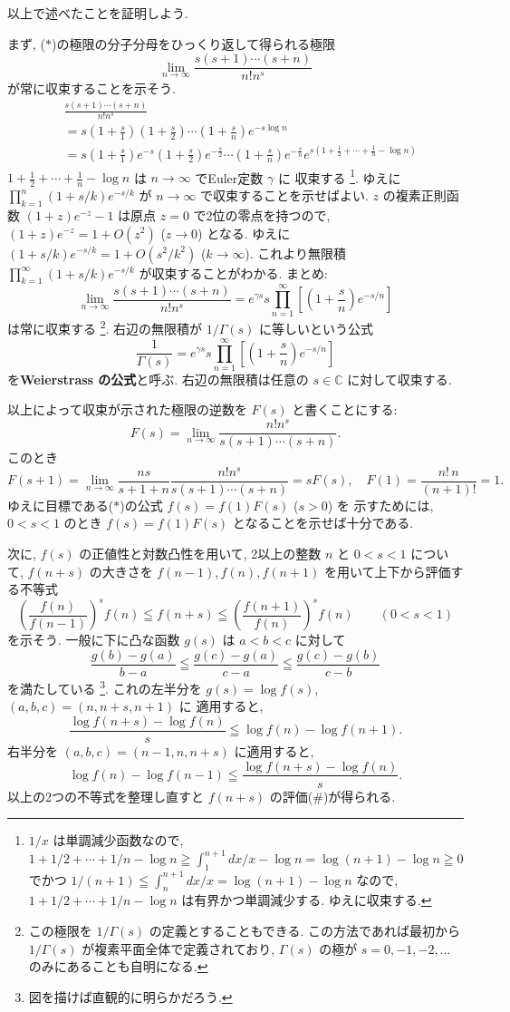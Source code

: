 \documentclass[12pt,twoside]{jarticle}
\newcommand\C{{\mathbb C}} %
\theoremstyle{jplain}
\theoremstyle{jplain}
\theoremstyle{jplain}
\numberwithin{theorem}{section}
\numberwithin{equation}{section}
\numberwithin{figure}{section}
\numberwithin{table}{section}
\begin{document}
以上で述べたことを証明しよう.

まず, ($*$)の極限の分子分母をひっくり返して得られる極限
\[
\lim_{n\to\infty}\frac{s(s+1)\cdots(s+n)}{n!n^s}
\]
が常に収束することを示そう.
\begin{align*}
&
\frac{s(s+1)\cdots(s+n)}{n!n^s}
\\ &
=
s\left(1+\frac{s}{1}\right)\left(1+\frac{s}{2}\right)\cdots\left(1+\frac{s}{n}\right)
e^{-s\log n}
\\ &
=
s\left(1+\frac{s}{1}\right)e^{-s}\left(1+\frac{s}{2}\right)e^{-\frac{s}{2}}
 \cdots\left(1+\frac{s}{n}\right)e^{-\frac{s}{n}}
e^{s\left(1+\frac{1}{2}+\cdots+\frac{1}{n}-\log n\right)}
\end{align*}
$1+\frac{1}{2}+\cdots+\frac{1}{n}-\log n$ は $n\to\infty$ でEuler定数 $\gamma$ に
収束する%
\footnote{$1/x$ は単調減少函数なので, 
$1+1/2+\cdots+1/n-\log n\geqq\int_1^{n+1}dx/x-\log n=\log(n+1)-\log n\geqq 0$
でかつ $1/(n+1)\leqq\int_n^{n+1}dx/x=\log(n+1)-\log n$ なので,
$1+1/2+\cdots+1/n-\log n$ は有界かつ単調減少する. ゆえに収束する.}.
ゆえに $\prod_{k=1}^n(1+s/k)e^{-s/k}$ が $n\to\infty$ で収束することを示せばよい. 
$z$ の複素正則函数 $(1+z)e^{-z}-1$ は原点 $z=0$ で2位の零点を持つので, 
$(1+z)e^{-z}=1+O(z^2)$ ($z\to 0$) となる.
ゆえに $(1+s/k)e^{-s/k}=1+O(s^2/k^2)$ ($k\to\infty$).
これより無限積 $\prod_{k=1}^\infty(1+s/k)e^{-s/k}$ が収束することがわかる.
まとめ:
\[
\lim_{n\to\infty}\frac{s(s+1)\cdots(s+n)}{n!n^s}
=e^{\gamma s}s\prod_{n=1}^\infty\left[ \left(1+\frac{s}{n}\right)e^{-s/n} \right]
\]
は常に収束する%
\footnote{この極限を $1/\Gamma(s)$ の定義とすることもできる.
この方法であれば最初から $1/\Gamma(s)$ が複素平面全体で定義されており, 
$\Gamma(s)$ の極が $s=0,-1,-2,\ldots$ のみにあることも自明になる.}.
右辺の無限積が $1/\Gamma(s)$ に等しいという公式
\[
\frac{1}{\Gamma(s)}
=e^{\gamma s}s\prod_{n=1}^\infty\left[ \left(1+\frac{s}{n}\right)e^{-s/n} \right]
\]
を{\bf Weierstrass の公式}と呼ぶ. 
右辺の無限積は任意の $s\in\C$ に対して収束する.

以上によって収束が示された極限の逆数を $F(s)$ と書くことにする:
\[
F(s)=\lim_{n\to\infty}\frac{n!n^s}{s(s+1)\cdots(s+n)}.
\]
このとき
\[
F(s+1)
=\lim_{n\to\infty}
\frac{ns}{s+1+n}\frac{n!n^s}{s(s+1)\cdots(s+n)}
=sF(s), \quad
F(1)=\frac{n!\,n}{(n+1)!}=1.
\]
ゆえに目標である($*$)の公式 $f(s)=f(1)F(s)$ ($s>0$) を
示すためには, $0<s<1$ のとき $f(s)=f(1)F(s)$ となることを示せば十分である.

次に, $f(s)$ の正値性と対数凸性を用いて, 
2以上の整数 $n$ と $0<s<1$ について, 
$f(n+s)$ の大きさを $f(n-1),f(n),f(n+1)$ を用いて上下から評価する不等式
\[
\left(\frac{f(n)}{f(n-1)}\right)^s f(n)
\leqq f(n+s)
\leqq \left(\frac{f(n+1)}{f(n)}\right)^s f(n)
\qquad(0<s<1)
\tag{$\#$}
\]
を示そう. 一般に下に凸な函数 $g(s)$ は $a<b<c$ に対して
\[
\frac{g(b)-g(a)}{b-a} 
\leqq \frac{g(c)-g(a)}{c-a} 
\leqq \frac{g(c)-g(b)}{c-b}
\]
を満たしている
\footnote{図を描けば直観的に明らかだろう.}.
これの左半分を $g(s)=\log f(s)$, $(a,b,c)=(n,n+s,n+1)$ に
適用すると,
\[
\frac{\log f(n+s)-\log f(n)}{s}\leqq \log f(n)-\log f(n+1).
\]
右半分を $(a,b,c)=(n-1,n,n+s)$ に適用すると, 
\[
\log f(n)-\log f(n-1)\leqq\frac{\log f(n+s)-\log f(n)}{s}.
\]
以上の2つの不等式を整理し直すと $f(n+s)$ の評価($\#$)が得られる.
\end{document}
